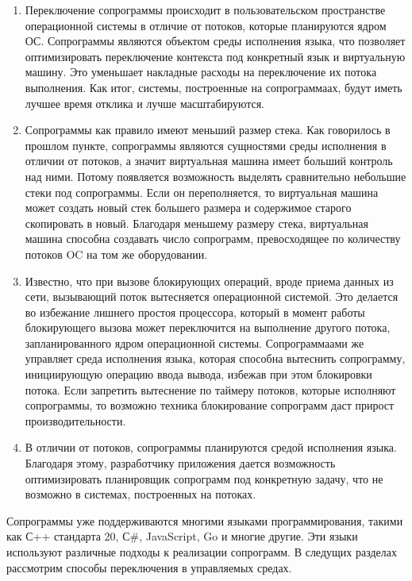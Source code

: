 	\begin{enumerate}
		\item Переключение сопрограммы происходит в пользовательском пространстве операционной системы в отличие от
		потоков, которые планируются ядром ОС. Сопрограммы являются объектом среды исполнения языка, что
		позволяет оптимизировать переключение контекста под конкретный язык и виртуальную машину. Это уменьшает
		накладные расходы на переключение их потока выполнения. Как итог, системы, построенные на сопрограммаах, будут
		иметь лучшее время отклика и лучше масштабируются.
		\item Сопрограммы как правило имеют меньший размер стека. Как говорилось в прошлом пункте,
		сопрограммы являются сущностями среды исполнения в отличии от потоков, а значит виртуальная машина имеет больший
		контроль над ними. Потому появляется возможность выделять сравнительно небольшие стеки под сопрограммы. 
		Если он переполняется, то виртуальная машина может создать новый стек большего размера и содержимое старого
		скопировать в новый. Благодаря меньшему размеру стека, виртуальная машина способна создавать число
		сопрограмм, превосходящее по количеству потоков OC на том же оборудовании.
		\item Известно, что при вызове блокирующих операций, вроде приема данных из сети, вызывающий поток вытесняется
		операционной системой\cite{linux-api}. Это делается во избежание лишнего простоя процессора, который в момент
		работы блокирующего вызова может переключится на выполнение другого потока, запланированного ядром операционной
		системы. Сопрограммаами же управляет среда исполнения языка, которая способна вытеснить сопрограмму,
		инициирующую операцию ввода вывода, избежав при	этом блокировки потока. Если запретить
		вытеснение по таймеру потоков, которые исполняют сопрограммы, то возможно техника блокирование сопрограмм
		даст прирост производительности.
		\item В отличии от потоков, сопрограммы планируются средой исполнения языка. Благодаря этому, разработчику
		приложения дается возможность оптимизировать планировщик сопрограмм	под конкретную задачу, что не возможно в
		системах, построенных на потоках.
	\end{enumerate}
	Сопрограммы уже поддерживаются многими языками программирования, такими как С++ стандарта 20, С\#, JavaScript,
	Go и многие другие. Эти языки используют различные подходы к реализации сопрограмм. В следущих разделах 
	рассмотрим способы переключения в управляемых средах.
	\clearpage
	
